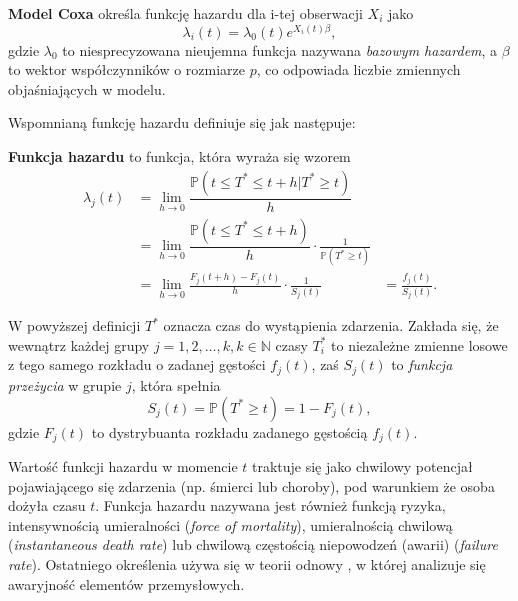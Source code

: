 \begin{definition}
\textbf{Model Coxa} określa funkcję hazardu dla i-tej obserwacji $X_i$ jako
\begin{equation}
\lambda_i(t) = \lambda_0(t)e^{X_i(t)\beta},
\end{equation}
gdzie $\lambda_0$ to niesprecyzowana nieujemna funkcja nazywana \textit{bazowym hazardem}, a $\beta$ to wektor współczynników o rozmiarze $p$, co odpowiada liczbie zmiennych objaśniających w modelu.
\end{definition}

Wspomnianą funkcję hazardu definiuje się jak następuje:
\begin{definition}
\textbf{Funkcja hazardu} to funkcja, która wyraża się wzorem
\begin{equation}
\begin{align*}
\lambda_j(t) & =  \lim\limits_{h\rightarrow 0}\dfrac{\mathbb{P}(t \leq T^* \leq t +h | T^* \geq t)}{h} & \ \\
 \ & = \lim\limits_{h\rightarrow 0}\dfrac{\mathbb{P}(t \leq T^* \leq t +h )}{h}\cdot\frac{1}{  \mathbb{P}(T^* \geq t)} & \ \\ \ & = \lim\limits_{h\rightarrow 0} \frac{F_j(t+h) - F_j(t) }{h}\cdot\frac{1}{S_j(t)} & =  \frac{f_j(t)}{S_j(t)}.
 \end{align*}
\end{equation}
\end{definition}

W powyższej definicji $T^*$ oznacza czas do wystąpienia zdarzenia. Zakłada się, że wewnątrz każdej grupy $j=1,2,\dots, k, k \in \mathbb{N}$ czasy $T_i^*$ to niezależne zmienne losowe z tego samego rozkładu o zadanej gęstości $f_j(t)$, zaś $S_j(t)$ to \textit{funkcja przeżycia} w grupie $j$, która spełnia 
\begin{equation}
S_j(t) = \mathbb{P}(T^* \geq t )  = 1 - F_j(t), 
\end{equation}
gdzie $F_j(t)$ to dystrybuanta rozkładu zadanego gęstością $f_j(t)$.


Wartość funkcji hazardu w momencie $t$ traktuje się jako chwilowy potencjał pojawiającego się zdarzenia (np. śmierci lub choroby), pod warunkiem że osoba dożyła czasu $t$. Funkcja hazardu nazywana jest również funkcją ryzyka,
intensywnością umieralności (\textit{force of mortality}), umieralnością
chwilową (\textit{instantaneous death rate}) lub chwilową
częstością niepowodzeń (awarii) (\textit{failure rate}). Ostatniego
określenia używa się w teorii odnowy \cite{cox0}, w której analizuje
się awaryjność elementów przemysłowych. 



